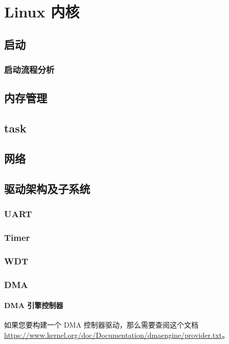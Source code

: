 \section{Linux 内核}

\subsection{启动}
\subsubsection{启动流程分析}

\subsection{内存管理}

\subsection{task}

\subsection{网络}

\subsection{驱动架构及子系统}
\subsubsection{UART}

\subsubsection{Timer}

\subsubsection{WDT}

\subsubsection{DMA}

\paragraph{DMA 引擎控制器}

如果您要构建一个 DMA 控制器驱动，那么需要查阅这个文档
\url{https://www.kernel.org/doc/Documentation/dmaengine/provider.txt}。

